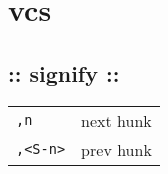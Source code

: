 \section{\hrulefill vcs\hrulefill}
\subsection{:: signify ::}
\begin{tabular}{@{}ll@{}}
    \verb!,n!       & next hunk \\
    \verb!,<S-n>!   & prev hunk \\
\end{tabular}
